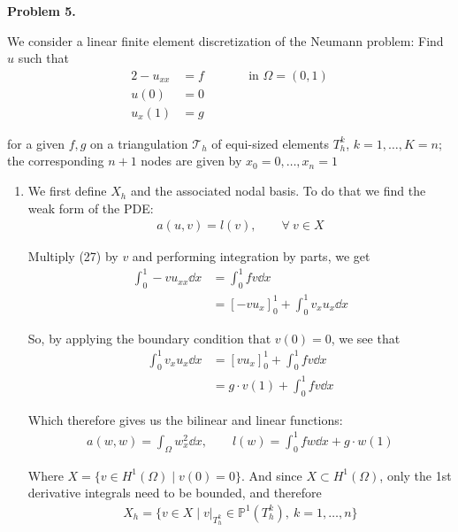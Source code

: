 \textbf{Problem 5.}

We consider a linear finite element discretization of the Neumann problem: Find $u$ such that
\begin{alignat}{2}
    -u_{xx} &= f \qquad&& \text{in $\Omega=(0,1)$} \\
    u(0)    &= 0 \\
    u_x(1)  &= g
\end{alignat}

for a given $f,g$ on a triangulation $\mathcal{T}_h$ of equi-sized elements $T_h^k$, $k=1,\dots,K = n$; the corresponding $n+1$ nodes are given by $x_0=0,\dots, x_n = 1$

\begin{enumerate}[label=(\alph*),leftmargin=*,itemsep=0mm]
    
    \item We first define $X_h$ and the associated nodal basis.  To do that we find the weak form of the PDE:
    \begin{gather*}
        a(u,v) = l(v), \qquad \forall\>v\in X
    \end{gather*}
    
    Multiply (27) by $v$ and performing integration by parts, we get
    \begin{align*}
        \int_0^1 -vu_{xx} \dd{x} &= \int_0^1 fv \dd{x} \\
        &= [-vu_x]_0^1 + \int_0^1 v_xu_x \dd{x}
    \end{align*}
    
    So, by applying the boundary condition that $v(0)=0$, we see that
    \begin{align*}
        \int_0^1 v_xu_x \dd{x}
        &= [vu_x]_0^1 + \int_0^1 fv \dd{x} \\
        &= g\cdot v(1) + \int_0^1 fv \dd{x}
    \end{align*}
    
    Which therefore gives us the bilinear and linear functions:
    \begin{align}
        a(w,w) = \int_\Omega w_x^2\dd{x}, \qquad
        l(w) = \int_0^1 fw \dd{x} + g\cdot w(1)
    \end{align}
    
    Where $X = \{v\in H^1(\Omega) \mid v(0) = 0\}$.  And since $X \subset H^1(\Omega)$, only the 1st derivative integrals need to be bounded, and therefore
    \begin{align}
        X_h = \{ v\in X \mid v|_{T_h^k} \in \mathbb{P}^1(T_h^k), \> k = 1, \dots, n\}
    \end{align}
    

\end{enumerate}
